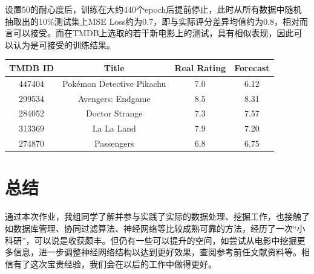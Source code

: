 \documentclass[UTF8]{ctexart}
\begin{document}
\par 设置50的耐心度后，训练在大约440个epoch后提前停止，此时从所有数据中随机抽取出的10\%测试集上MSE Loss约为0.7，即与实际评分差异均值约为0.8，相对而言可以接受。而在TMDB上选取的若干新电影上的测试，具有相似表现，因此可以认为是可接受的训练结果。
\par
\centering
\begin{tabular}{cccc}
\hline
TMDB ID& Title& Real Rating& Forecast\\
\hline
447404& Pokémon Detective Pikachu& 7.0& 6.12\\
299534& Avengers: Endgame& 8.5& 8.31\\
284052& Doctor Strange& 7.3& 7.57\\
313369& La La Land& 7.9& 7.20\\
274870& Passengers& 6.8& 6.75\\
\hline
\end{tabular}
\section{总结}
\par 通过本次作业，我组同学了解并参与实践了实际的数据处理、挖掘工作，也接触了如数据库管理、协同过滤算法、神经网络等比较成熟可靠的方法，经历了一次“小科研”，可以说是收获颇丰。但仍有一些可以提升的空间，如尝试从电影中挖掘更多信息，进一步调整神经网络结构以达到更好效果，查阅参考前任文献资料等。相信有了这次宝贵经验，我们会在以后的工作中做得更好。
\end{document}
